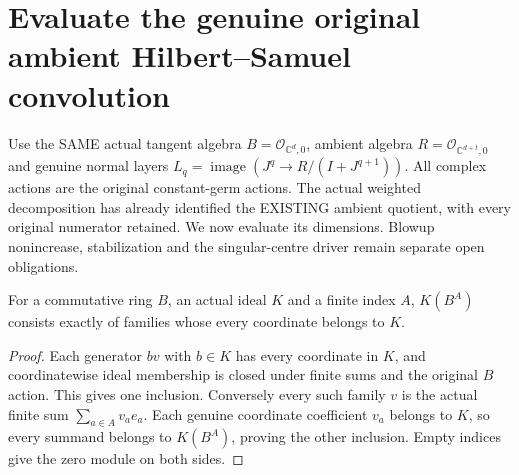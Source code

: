 \section{Evaluate the genuine original ambient Hilbert--Samuel convolution}

Use the SAME actual tangent algebra $B=\mathcal O_{\mathbb C^d,0}$,
ambient algebra $R=\mathcal O_{\mathbb C^{d+t},0}$ and genuine normal
layers $L_q=\operatorname{image}(J^q\to R/(I+J^{q+1}))$. All complex
actions are the original constant-germ actions. The actual weighted
decomposition has already identified the EXISTING ambient quotient,
with every original numerator retained. We now evaluate its dimensions.
Blowup nonincrease, stabilization and the singular-centre driver remain
separate open obligations.

\begin{lemma}
\label{hir:relative-normal-actual-free-quotient-coordinate-ideal}
\leanok
For a commutative ring $B$, an actual ideal $K$ and a finite index $A$,
$K(B^A)$ consists exactly of families whose every coordinate belongs to $K$.
\end{lemma}
\begin{proof}
Each generator $b v$ with $b\in K$ has every coordinate in $K$, and
coordinatewise ideal membership is closed under finite sums and the
original $B$ action. This gives one inclusion. Conversely every such
family $v$ is the actual finite sum $\sum_{a\in A}v_a e_a$. Each genuine
coordinate coefficient $v_a$ belongs to $K$, so every summand belongs
to $K(B^A)$, proving the other inclusion. Empty indices give the zero
module on both sides.
\end{proof}

